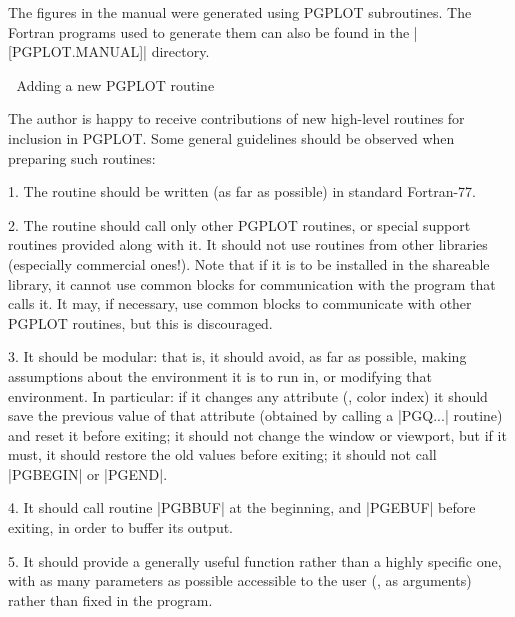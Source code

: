 The figures in the manual were generated using PGPLOT subroutines.  The 
Fortran programs used to generate them can also be found in the 
|[PGPLOT.MANUAL]| directory.


\beginsection Adding a new PGPLOT routine

The author is happy to receive contributions of new high-level routines 
for inclusion in PGPLOT.  Some general guidelines should be observed when
preparing such routines:
\item{1.} The routine should be written (as far as possible) in standard
Fortran-77.
\item{2.} The routine should call only other PGPLOT routines, or special
support routines provided along with it. It should not use routines from
other libraries (especially commercial ones!).  
Note that if it is to be installed in the shareable library, it cannot use 
common  blocks for communication with the program that calls it.  It 
may, if necessary, use common blocks to communicate with other PGPLOT
routines, but this is discouraged.
\item{3.} It should be modular: that is, it should avoid, as far as 
possible, making assumptions about the environment it is to run in, or 
modifying that environment.  In particular: if it changes any attribute
(\eg, color index) it should save the previous value of that attribute
(obtained by calling a |PGQ...| routine) and reset it before exiting;
it should not change the window or viewport, but if it must, it 
should restore the old values before exiting; it should not call 
|PGBEGIN| or |PGEND|.
\item{4.} It should call routine |PGBBUF| at the beginning, and |PGEBUF|
before exiting, in order to buffer its output.
\item{5.} It should provide a generally useful function rather than a 
highly specific one, with as many parameters as possible accessible to 
the user (\eg, as arguments) rather than fixed in the program. 

\endchapter
